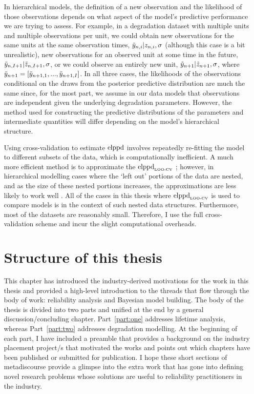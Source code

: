 In hierarchical models, the definition of a new observation and the likelihood of those observations depends on what aspect of the model's predictive performance we are trying to assess. For example, in a degradation dataset with multiple units and multiple observations per unit, we could obtain new observations for the same units at the same observation times, $\Tilde{y}_{n,i} | z_{n, i}, \sigma$ (although this case is a bit unrealistic), new observations for an observed unit at some time in the future, $\Tilde{y}_{n, I + 1}|\Tilde{z}_{n, I + 1}, \sigma$, or we could observe an entirely new unit, $\Tilde{y}_{n + 1}|\Tilde{z}_{n + 1}, \sigma$, where $\Tilde{y}_{n + 1} = \left[\Tilde{y}_{n + 1, 1}, ..., \Tilde{y}_{n + 1, I}\right]$. In all three cases, the likelihoods of the observations conditional on the draws from the posterior predictive distribution are much the same since, for the most part, we assume in our data models that observations are independent given the underlying degradation parameters. However, the method used for constructing the predictive distributions of the parameters and intermediate quantities will differ depending on the model's hierarchical structure.

Using cross-validation to estimate $\hbox{elppd}$ involves repeatedly re-fitting the model to different subsets of the data, which is computationally inefficient. A much more efficient method is to approximate the $\hbox{elppd}_{\text{\tiny{LOO-CV}}}$ \citep{Vehtari2017}; however, in hierarchical modelling cases where the `left out' portions of the data are nested, and as the size of these nested portions increases, the approximations are less likely to work well \citep{Vehtari2017}. All of the cases in this thesis where $\hbox{elppd}_{\text{\tiny{LOO-CV}}}$ is used to compare models is in the context of such nested data structures. Furthermore, most of the datasets are reasonably small. Therefore, I use the full cross-validation scheme and incur the slight computational overheads.

\section{Structure of this thesis}
\label{sec:thesis-structure}

This chapter has introduced the industry-derived motivations for the work in this thesis and provided a high-level introduction to the threads that flow through the body of work: reliability analysis and Bayesian model building. The body of the thesis is divided into two parts and unified at the end by a general discussion/concluding chapter. Part~\ref{part:one} addresses lifetime analysis, whereas Part~\ref{part:two} addresses degradation modelling. At the beginning of each part, I have included a preamble that provides a background on the industry placement project/s that motivated the works and points out which chapters have been published or submitted for publication. I hope these short sections of metadiscourse provide a glimpse into the extra work that has gone into defining novel research problems whose solutions are useful to reliability practitioners in the industry.

